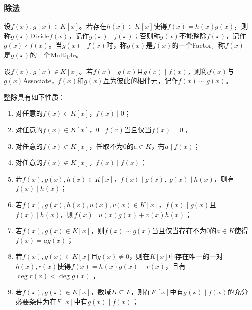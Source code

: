 \subsubsection{除法}
\begin{definition}
	设$f(x),g(x)\in K[x]$。若存在$h(x)\in K[x]$使得$f(x)=h(x)g(x)$，则称$g(x)$\gls{Divide}$f(x)$，记作$g(x)\mid f(x)$；否则称$g(x)$不能整除$f(x)$，记作$g(x)\nmid f(x)$。当$g(x)\mid f(x)$时，称$g(x)$是$f(x)$的一个\gls{Factor}，称$f(x)$是$g(x)$的一个\gls{Multiple}。
\end{definition}
\begin{definition}
	设$f(x),g(x)\in K[x]$。若$f(x)\mid g(x)$且$g(x)\mid f(x)$，则称$f(x)$与$g(x)$\gls{Associate}，$f(x)$和$g(x)$互为彼此的相伴元，记作$f(x)\sim g(x)$。
\end{definition}
\begin{property}\label{prop:UnivariatePolynomialDivision}
	整除具有如下性质：
	\begin{enumerate}
		\item 对任意的$f(x)\in K[x]$，$f(x)\mid0$；
		\item 对任意的$f(x)\in K[x]$，$0\mid f(x)$当且仅当$f(x)=0$；
		\item 对任意的$f(x)\in K[x]$，任取不为$0$的$a\in K$，有$a\mid f(x)$；
		\item 对任意的$f(x)\in K[x]$，$f(x)\mid f(x)$；
		\item 若$f(x),g(x),h(x)\in K[x]$，$f(x)\mid g(x),\;g(x)\mid h(x)$，则有$f(x)\mid h(x)$；
		\item 若$f(x),g(x),h(x),u(x),v(x)\in K[x]$，$f(x)\mid g(x)$且$f(x)\mid h(x)$，则$f(x)\mid u(x)g(x)+v(x)h(x)$；
		\item 若$f(x),g(x)\in K[x]$，则$f(x)\sim g(x)$当且仅当存在不为$0$的$a\in K$使得$f(x)=ag(x)$；
		\item 若$f(x),g(x)\in K[x]$且$g(x)\ne0$，则在$K[x]$中存在唯一的一对$h(x),r(x)$使得$f(x)=h(x)g(x)+r(x)$，且有$\deg r(x)<\deg g(x)$；
		\item 若$f(x),g(x)\in K[x]$，数域$K\subseteq F$，则在$K[x]$中有$g(x)\mid f(x)$的充分必要条件为在$F[x]$中有$g(x)\mid f(x)$；
	\end{enumerate}
\end{property}
